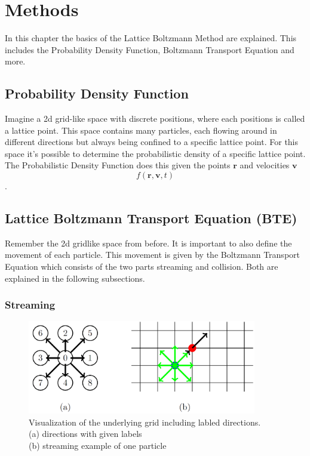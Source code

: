 \chapter{Methods}
In this chapter the basics of the Lattice Boltzmann Method are explained.
This includes the Probability Density Function, Boltzmann Transport Equation and more.


\section{Probability Density Function}
Imagine a 2d grid-like space with discrete positions, where each positions is called a lattice point.
This space contains many particles, each flowing around in different directions but always being confined to a specific lattice point.
For this space it's possible to determine the probabilistic density of a specific lattice point.
The Probabilistic Density Function does this given the points \(\mathbf r\) and velocities \(\mathbf v\)
\[f(\mathbf r ,\mathbf v,t)\].


\section{Lattice Boltzmann Transport Equation (BTE)}
Remember the 2d gridlike space from before.
It is important to also define the movement of each particle.
This movement is given by the Boltzmann Transport Equation which consists of the two parts streaming and collision.
Both are explained in the following subsections.

\subsection{Streaming}

\begin{figure}[h!]
    \begin{center}
        \includegraphics[width=10cm]{logos/Gitter_LBM.png}
        \caption[Visualization of the underlying grid including labled directions.]{
            Visualization of the underlying grid including labled directions. \\
            (a) directions with given labels \\
            (b) streaming example of one particle
        }
        \label{fig:bte}
    \end{center}
\end{figure}

